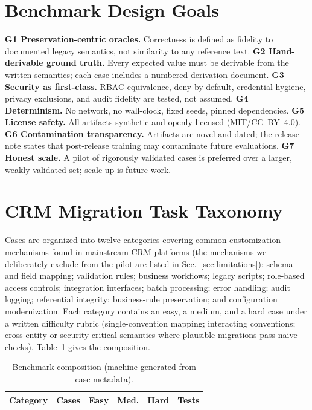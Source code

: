 \documentclass{ieeetj}
\begin{document}
\section{Benchmark Design Goals}
\label{sec:goals}
\textbf{G1 Preservation-centric oracles.} Correctness is defined as fidelity to documented
legacy semantics, not similarity to any reference text. \textbf{G2 Hand-derivable ground
truth.} Every expected value must be derivable from the written semantics; each case includes a
numbered derivation document. \textbf{G3 Security as first-class.} RBAC equivalence,
deny-by-default, credential hygiene, privacy exclusions, and audit fidelity are tested, not
assumed. \textbf{G4 Determinism.} No network, no wall-clock, fixed seeds, pinned dependencies.
\textbf{G5 License safety.} All artifacts synthetic and openly licensed (MIT/CC~BY~4.0).
\textbf{G6 Contamination transparency.} Artifacts are novel and dated; the release note states
that post-release training may contaminate future evaluations. \textbf{G7 Honest scale.} A
pilot of \NumCases{} rigorously validated cases is preferred over a larger, weakly validated
set; scale-up is future work.

\section{CRM Migration Task Taxonomy}
\label{sec:taxonomy}
Cases are organized into twelve categories covering common customization mechanisms found in
mainstream CRM platforms (the mechanisms we deliberately exclude from the pilot are listed in
Sec.~\ref{sec:limitations}): schema and field mapping; validation rules; business workflows;
legacy scripts; role-based access controls; integration interfaces; batch processing; error
handling; audit logging; referential integrity; business-rule preservation; and configuration
modernization. Each category contains an easy, a medium, and a hard case under a written
difficulty rubric (single-convention mapping; interacting conventions; cross-entity or
security-critical semantics where plausible migrations pass naive checks). Table~\ref{tab:comp}
gives the composition.

\begin{table}[t]
\caption{Benchmark composition (machine-generated from case metadata).}
\label{tab:comp}
\centering
\begin{tabular}{lccccc}
\toprule
Category & Cases & Easy & Med. & Hard & Tests \\
\midrule

\end{tabular}
\end{table}
\end{document}
